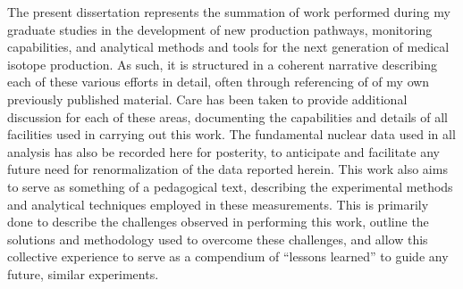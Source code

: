 The present dissertation represents the summation of work performed during my graduate studies in the development of new production pathways, monitoring capabilities, and analytical methods and tools for the next generation of medical isotope production.
As such, it is structured in a coherent narrative describing each of these various efforts in detail, often  through referencing of  of my own previously published material.
Care has been taken to provide additional discussion for each of these areas, documenting the capabilities and details of all facilities used in carrying out this work.
The fundamental nuclear data used in all analysis has also be recorded here for posterity, to anticipate and facilitate any future need for renormalization of the data reported herein.
This work also aims to serve as something of a pedagogical text, describing the experimental methods and analytical techniques employed in these measurements.
This is primarily done to describe the challenges observed in performing this work, outline the solutions and methodology used to overcome these challenges, and allow this collective experience to serve as a compendium of \enquote{lessons learned} to guide any future, similar experiments.





